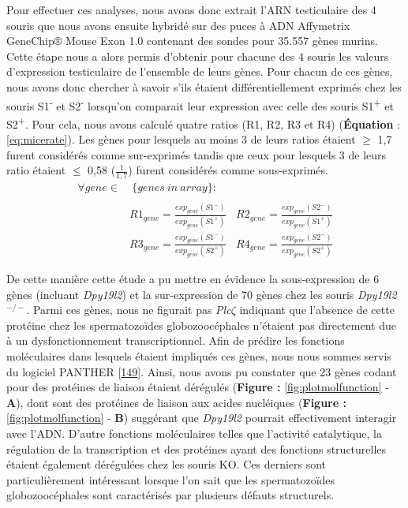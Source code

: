 \documentclass[12pt,twoside]{ugathesis}
\theoremstyle{definition}
\theoremstyle{definition}
\theoremstyle{remark}
\begin{document}
Pour effectuer ces analyses, nous avons donc extrait l'ARN testiculaire
des 4 souris que nous avons ensuite hybridé sur des puces à ADN
Affymetrix GeneChip® Mouse Exon 1.0 contenant des sondes pour 35.557
gènes murins. Cette étape nous a alors permis d'obtenir pour chacune des
4 souris les valeurs d'expression testiculaire de l'ensemble de leurs
gènes. Pour chacun de ces gènes, nous avons donc chercher à savoir s'ils
étaient différentiellement exprimés chez les souris
S1\textsuperscript{-} et S2\textsuperscript{-} lorsqu'on comparait leur
expression avec celle des souris S1\textsuperscript{+} et
S2\textsuperscript{+}. Pour cela, nous avons calculé quatre ratios (R1,
R2, R3 et R4) (\textbf{Équation} : \eqref{eq:micerate}). Les gènes pour
lesquels au moins 3 de leurs ratios étaient \(\ge\) 1,7 furent
considérés comme sur-exprimés tandis que ceux pour lesquels 3 de leurs
ratio étaient \(\le\) 0,58 (\(\frac{1}{1,7}\)) furent considérés comme
sous-exprimés.\\

\begin{equation} 
\begin{split}
\forall gene \in & \ \{genes\ in\ array\}: \\
\\
& R1_{gene} = \frac{exp_{gene}(S1^-)}{exp_{gene}(S1^+)} \ \ \ \ R2_{gene} = \frac{exp_{gene}(S2^-)}{exp_{gene}(S1^+)} \\
& R3_{gene} = \frac{exp_{gene}(S1^-)}{exp_{gene}(S2^+)} \ \ \ \ R4_{gene} = \frac{exp_{gene}(S2^-)}{exp_{gene}(S2^+)} 
\label{eq:micerate}
\end{split}
\end{equation}

De cette manière cette étude a pu mettre en évidence la sous-expression
de 6 gènes (incluant \emph{Dpy19l2}) et la sur-expression de 70 gènes
chez les souris \emph{Dpy19l2}\(^{-/-}\). Parmi ces gènes, nous ne
figurait pas \emph{Plc}\(\zeta\) indiquant que l'absence de cette
protéine chez les spermatozoïdes globozoocéphales n'étaient pas
directement due à un dysfonctionnement transcriptionnel. Afin de prédire
les fonctions moléculaires dans lesquels étaient impliqués ces gènes,
nous nous sommes servis du logiciel PANTHER
{[}\protect\hyperlink{ref-Mi2017}{149}{]}. Ainsi, nous avons pu
constater que 23 gènes codant pour des protéines de liaison étaient
dérégulés (\textbf{Figure : }\ref{fig:plotmolfunction} - \textbf{A}),
dont sont des protéines de liaison aux acides nucléiques (\textbf{Figure
: }\ref{fig:plotmolfunction} - \textbf{B}) suggérant que \emph{Dpy19l2}
pourrait effectivement interagir avec l'ADN. D'autre fonctions
moléculaires telles que l'activité catalytique, la régulation de la
transcription et des protéines ayant des fonctions structurelles étaient
également dérégulées chez les souris KO. Ces derniers sont
particulièrement intéressant lorsque l'on sait que les spermatozoïdes
globozoocéphales sont caractérisés par plusieurs défauts structurels.
\end{document}
